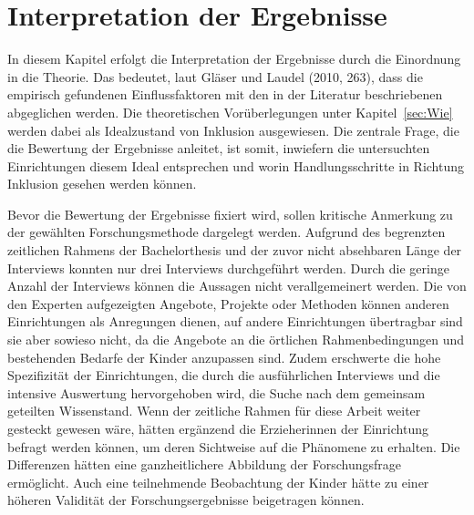 \section{Interpretation der Ergebnisse}
In diesem Kapitel erfolgt die Interpretation der Ergebnisse durch die Einordnung in die Theorie. Das bedeutet, laut Gläser und Laudel (2010, 263), dass die empirisch gefundenen Einflussfaktoren mit den in der Literatur beschriebenen abgeglichen werden. Die theoretischen Vorüberlegungen unter Kapitel~\ref{sec:Wie} werden dabei als Idealzustand von Inklusion ausgewiesen. Die zentrale Frage, die die Bewertung der Ergebnisse anleitet, ist somit, inwiefern die untersuchten Einrichtungen diesem Ideal entsprechen und worin Handlungsschritte in Richtung Inklusion gesehen werden können. 

Bevor die Bewertung der Ergebnisse fixiert wird, sollen kritische Anmerkung zu der gewählten Forschungsmethode dargelegt werden.
Aufgrund des begrenzten zeitlichen Rahmens der Bachelorthesis und der zuvor nicht absehbaren Länge der Interviews konnten nur drei Interviews durchgeführt werden. Durch die geringe Anzahl der Interviews können die Aussagen nicht verallgemeinert werden. Die von den Experten aufgezeigten Angebote, Projekte oder Methoden können anderen Einrichtungen als Anregungen dienen, auf andere Einrichtungen übertragbar sind sie aber sowieso nicht, da die Angebote an die örtlichen Rahmenbedingungen und bestehenden Bedarfe der Kinder anzupassen sind. 
Zudem erschwerte die hohe Spezifizität der Einrichtungen, die durch die ausführlichen Interviews und die intensive Auswertung hervorgehoben wird, die Suche nach dem gemeinsam geteilten Wissenstand. Wenn der zeitliche Rahmen für diese Arbeit weiter gesteckt gewesen wäre, hätten ergänzend die Erzieherinnen der Einrichtung befragt werden können, um deren Sichtweise auf die Phänomene zu erhalten. Die Differenzen hätten eine ganzheitlichere Abbildung der Forschungsfrage ermöglicht. Auch eine teilnehmende Beobachtung der Kinder hätte zu einer höheren Validität der Forschungsergebnisse beigetragen können.

